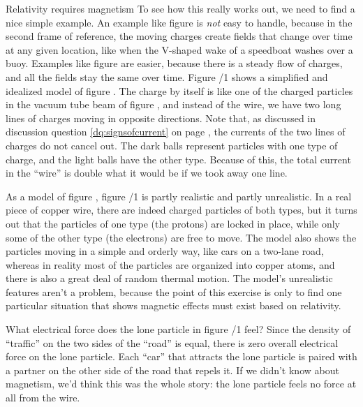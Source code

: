\begin{envsubsection}{Relativity requires magnetism}
	To see how this really works out, we need to find a nice simple example.
	An example like figure  is \emph{not} easy
	to handle, because in the second frame of reference, the moving charges
	create fields that change over time at any given location, like when the V-shaped wake of a speedboat
	washes over a buoy. Examples like
	figure  are easier, because there is a steady flow of charges, and
	all the fields stay the same over time.
        Figure /1 shows a simplified and idealized model of figure .
	The charge by itself is like one of the charged particles
	in the vacuum tube beam of figure , and instead of the wire, we have
	two long lines of charges moving in opposite directions. Note that,
	as discussed in discussion question \ref{dq:signsofcurrent} on page \pageref{dq:signsofcurrent},
	the currents of the two lines of charges do not cancel out. The dark balls represent particles with
	one type of charge, and the light balls have the other type. Because of this, the total current in
	the ``wire'' is double what it would be if we took away one line.

	As a model of figure , figure /1 is partly realistic and
	partly unrealistic. In a real piece of copper wire, there are indeed charged particles of both types,
	but it turns out that the particles of one type (the protons) are locked in place, while only some 
	of the other type (the electrons) are free to move. The model also shows the particles moving in
	a simple and orderly way, like cars on a two-lane road, whereas in reality most of the particles are
	organized into copper atoms, and there is also a great deal of random thermal motion.
	The model's unrealistic features aren't a
	problem, because the point of this exercise is only to find one particular situation that shows
	magnetic effects must exist based on relativity.

	What electrical force does the lone particle in figure /1 feel? Since the
	density of ``traffic'' on the two sides of the ``road'' is equal, there is zero overall
	electrical force on the lone particle. Each ``car'' that attracts the lone particle is paired with a partner on the other
	side of the road that repels it. If we didn't know about magnetism, we'd think this
	was the whole story: the lone particle feels no force at all from the wire.


\end{envsubsection}
